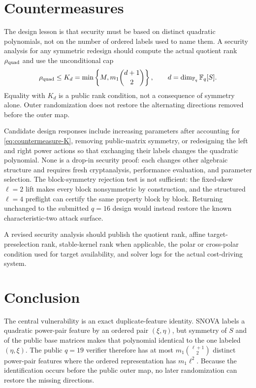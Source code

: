 \documentclass[11pt]{article}
\newcommand{\F}{\mathbb F}
\newcommand{\SNOVA}{\textsf{SNOVA}}
\begin{document}
\section{Countermeasures}\label{sec:countermeasures}

The design lesson is that security must be based on distinct quadratic
polynomials, not on the number of ordered labels used to name them.  A security
analysis for any symmetric redesign should compute the actual quotient rank
$\rho_{\rm quad}$ and use the unconditional cap
\begin{equation}\label{eq:countermeasure-K}
 \rho_{\rm quad}\le K_d
 =\min\left\{M,m_1\binom{d+1}{2}\right\},
 \qquad d=\dim_{\F_q}\F_q[S].
\end{equation}
Equality with $K_d$ is a public rank condition, not a consequence of symmetry
alone.  Outer randomization does not restore the alternating directions removed
before the outer map.

Candidate design responses include increasing parameters after accounting for
\eqref{eq:countermeasure-K},
removing public-matrix symmetry, or redesigning the left and right power actions so
that exchanging their labels changes the quadratic polynomial.  None is a
drop-in security proof: each changes other algebraic structure and requires
fresh cryptanalysis, performance evaluation, and parameter selection.  The
block-symmetry rejection test is not sufficient: the fixed-skew $\ell=2$
lift makes every block nonsymmetric by construction, and the structured
$\ell=4$ preflight can certify the same property block by block.  Returning
unchanged to the submitted $q=16$ design would instead restore the known
characteristic-two attack surface.

A revised security analysis should publish the quotient rank, affine
target-preselection rank, stable-kernel rank when applicable, the polar or cross-polar condition
used for target availability, and solver logs for the actual cost-driving
system.

\section{Conclusion}\label{sec:conclusion}

The central vulnerability is an exact duplicate-feature identity.  \SNOVA{}
labels a quadratic power-pair feature by an ordered pair $(\xi,\eta)$, but
symmetry of $S$ and of the public base matrices makes that polynomial identical to the
one labeled $(\eta,\xi)$.  The public $q=19$ verifier therefore has at most
$m_1\binom{\ell+1}{2}$ distinct power-pair features where the ordered
representation has $m_1\ell^2$.  Because the identification occurs before the
public outer map, no later randomization can restore the missing directions.
\end{document}
